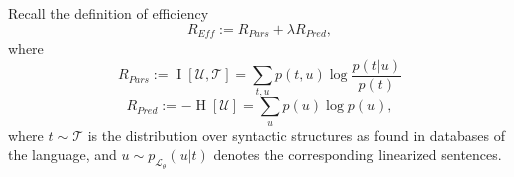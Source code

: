 \documentclass[10pt,twoside,lineno]{article}
\newcommand{\utterance}{\mathcal{U}}
\newcommand{\tree}{\mathcal{T}}
\begin{document}
Recall the definition of efficiency
\begin{equation}\label{eq:efficiency-recall}
	R_{\textit{Eff}} := R_{\textit{Pars}} + \lambda R_\textit{Pred},
\end{equation}
where
\begin{equation}\label{eq:rpars}
	R_{Pars} := \operatorname{I}[\utterance,\tree] = \sum_{t,u} p(t,u) \log \frac{p(t|u)}{p(t)} 
\end{equation}
\begin{equation}
	R_{Pred} := - \operatorname{H}[\utterance] = \sum_{u} p(u) \log p(u),
\end{equation}
where $t \sim \tree$ is the distribution over syntactic structures as found in databases of the language, and $u \sim p_{\mathcal{L}_\theta}(u|t)$ denotes the corresponding linearized sentences.
\end{document}
